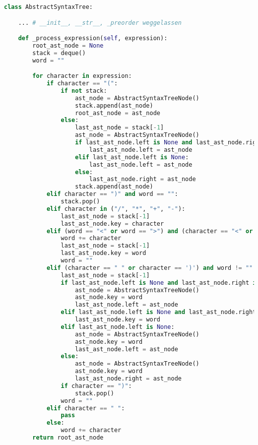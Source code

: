 \begin{lstlisting}[language=Python, caption=Klasse \textit{AbstractSyntaxTree}]
class AbstractSyntaxTree:

    ... # __init__, __str__, _preorder weggelassen 

    def _process_expression(self, expression):
        root_ast_node = None
        stack = deque()
        word = ""

        for character in expression:
            if character == "(":
                if not stack:
                    ast_node = AbstractSyntaxTreeNode()
                    stack.append(ast_node)
                    root_ast_node = ast_node
                else:
                    last_ast_node = stack[-1]
                    ast_node = AbstractSyntaxTreeNode()
                    if last_ast_node.left is None and last_ast_node.right is None:
                        last_ast_node.left = ast_node
                    elif last_ast_node.left is None:
                        last_ast_node.left = ast_node
                    else:
                        last_ast_node.right = ast_node
                    stack.append(ast_node)
            elif character == ")" and word == "":
                stack.pop()
            elif character in ("/", "*", "+", "-"):
                last_ast_node = stack[-1]
                last_ast_node.key = character
            elif (word == "<" or word == ">") and (character == "<" or character == ">"):
                word += character
                last_ast_node = stack[-1]
                last_ast_node.key = word
                word = ""
            elif (character == " " or character == ')') and word != "":
                last_ast_node = stack[-1]
                if last_ast_node.left is None and last_ast_node.right is None and not last_ast_node.key == "":
                    ast_node = AbstractSyntaxTreeNode()
                    ast_node.key = word
                    last_ast_node.left = ast_node
                elif last_ast_node.left is None and last_ast_node.right is None:
                    last_ast_node.key = word
                elif last_ast_node.left is None:
                    ast_node = AbstractSyntaxTreeNode()
                    ast_node.key = word
                    last_ast_node.left = ast_node
                else:
                    ast_node = AbstractSyntaxTreeNode()
                    ast_node.key = word
                    last_ast_node.right = ast_node
                if character == ")":
                    stack.pop()
                word = ""
            elif character == " ":
                pass
            else:
                word += character
        return root_ast_node
\end{lstlisting}

